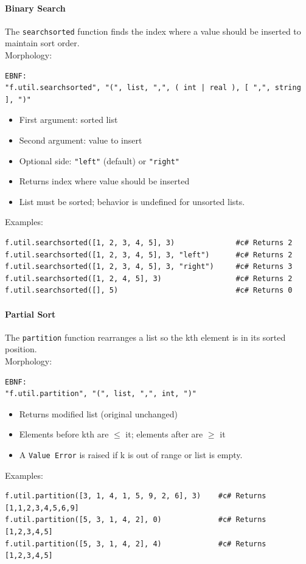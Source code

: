 \paragraph{Binary Search}
The \texttt{searchsorted} function finds the index where a value should be inserted to maintain sort order.\\
Morphology:
\begin{verbatim}
EBNF:
"f.util.searchsorted", "(", list, ",", ( int | real ), [ ",", string ], ")"
\end{verbatim}
\begin{itemize}
\item First argument: sorted list
\item Second argument: value to insert
\item Optional side: \texttt{"left"} (default) or \texttt{"right"}
\item Returns index where value should be inserted
\item List must be sorted; behavior is undefined for unsorted lists.
\end{itemize}
Examples:
\begin{verbatim}
f.util.searchsorted([1, 2, 3, 4, 5], 3)              #c# Returns 2
f.util.searchsorted([1, 2, 3, 4, 5], 3, "left")      #c# Returns 2
f.util.searchsorted([1, 2, 3, 4, 5], 3, "right")     #c# Returns 3
f.util.searchsorted([1, 2, 4, 5], 3)                 #c# Returns 2
f.util.searchsorted([], 5)                           #c# Returns 0
\end{verbatim}

\paragraph{Partial Sort}
The \texttt{partition} function rearranges a list so the kth element is in its sorted position.\\
Morphology:
\begin{verbatim}
EBNF:
"f.util.partition", "(", list, ",", int, ")"
\end{verbatim}
\begin{itemize}
\item Returns modified list (original unchanged)
\item Elements before kth are $\leq$ it; elements after are $\geq$ it
\item A \texttt{Value Error} is raised if k is out of range or list is empty.
\end{itemize}
Examples:
\begin{verbatim}
f.util.partition([3, 1, 4, 1, 5, 9, 2, 6], 3)    #c# Returns [1,1,2,3,4,5,6,9]
f.util.partition([5, 3, 1, 4, 2], 0)             #c# Returns [1,2,3,4,5]
f.util.partition([5, 3, 1, 4, 2], 4)             #c# Returns [1,2,3,4,5]
\end{verbatim}

